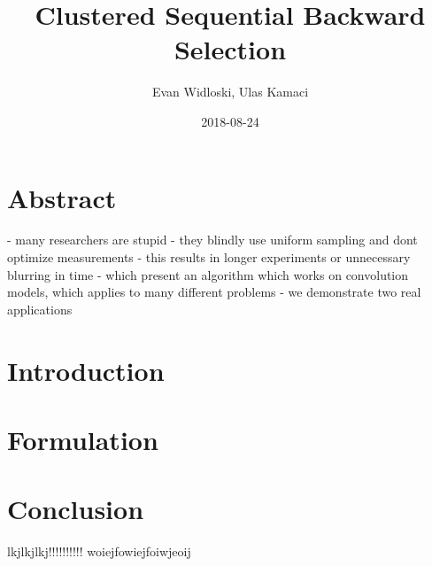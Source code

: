 \documentclass{article}
\title{Clustered Sequential Backward Selection}
\date{2018-08-24}
\author{Evan Widloski, Ulas Kamaci}
\begin{document}
\maketitle

\section{Abstract}
- many researchers are stupid - they blindly use uniform sampling and dont
optimize measurements
- this results in longer experiments or unnecessary blurring in time
- which present an algorithm which works on convolution models, which applies to
many different problems
- we demonstrate two real applications

\section{Introduction}
\section{Formulation}

\section{Conclusion}
lkjlkjlkj!!!!!!!!!! \cite{cetin}
woiejfowiejfoiwjeoij



\end{document}
